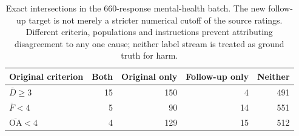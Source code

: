 \begin{table}[htbp]
\centering\small
\caption{Exact intersections in the 660-response mental-health batch. The new follow-up target is not merely a stricter numerical cutoff of the source ratings. Different criteria, populations and instructions prevent attributing disagreement to any one cause; neither label stream is treated as ground truth for harm.}
\label{tab:annotation_overlap}
\begin{tabular}{lrrrr}
\toprule
Original criterion & Both & Original only & Follow-up only & Neither \\
\midrule
$\overline D\geq3$ & 15 & 150 & 4 & 491 \\
$\overline F<4$ & 5 & 90 & 14 & 551 \\
$\overline{\mathrm{OA}}<4$ & 4 & 129 & 15 & 512 \\
\bottomrule
\end{tabular}
\end{table}
